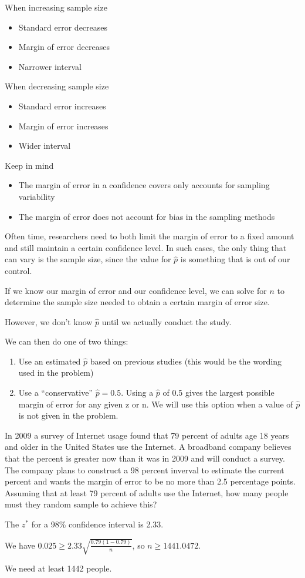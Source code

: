 \documentclass[../stats.tex]{subfiles}
\begin{document}
When increasing sample size 
\begin{itemize}
    \item Standard error decreases
    \item Margin of error decreases
    \item Narrower interval 
\end{itemize}

When decreasing sample size 
\begin{itemize}
    \item Standard error increases 
    \item Margin of error increases 
    \item Wider interval 
\end{itemize}

Keep in mind 
\begin{itemize}
    \item The margin of error in a confidence covers only accounts for sampling variability 
    \item The margin of error does not account for bias in the sampling methods 
\end{itemize}

Often time, researchers need to both limit the margin of error to a fixed amount and still maintain a certain confidence level. In such cases, the only thing that can vary is the sample size, since 
the value for $\hat{p}$ is something that is out of our control.

If we know our margin of error and our confidence level, we can solve for $n$ to determine the sample size needed to obtain a certain margin of error size.

However, we don't know $\hat{p}$ until we actually conduct the study.

We can then do one of two things:
\begin{enumerate}
    \item Use an estimated $\hat{p}$ based on previous studies (this would be the wording used in the problem)
    \item Use a ``conservative'' $\hat{p}=0.5$. Using a $\hat{p}$ of 0.5 gives the largest possible margin of error for any given z or n. We will use this option when a value of $\hat{p}$ is not given in the problem.
\end{enumerate}

\begin{example}
    In 2009 a survey of Internet usage found that 79 percent of adults age 18 years and older in the United States use the Internet. A broadband company believes that the percent is greater now than it was in 2009 and will conduct a survey.
    The company plans to construct a 98 percent inverval to estimate the current percent and wants the margin of error to be no more than 2.5 percentage points. Assuming that at least 79 percent of adults use the Internet, how many people must they random sample to achieve this?

    The $z^*$ for a 98\% confidence interval is 2.33.

    We have $0.025\geq 2.33\sqrt{\frac{0.79(1-0.79)}{n}}$, so $n\geq 1441.0472$.

    We need at least 1442 people.
\end{example}
\end{document}
